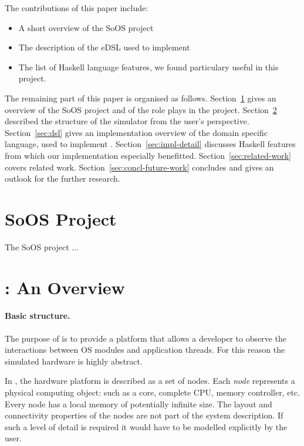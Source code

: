 The contributions of this paper include:
\begin{itemize}
\item A short overview of the SoOS project
\item The description of the eDSL used to implement \soosim
\item The list of Haskell language features, we found particulary useful in this project.
\end{itemize}

The remaining part of this paper is organised as follows.
Section~\ref{sec:soos-project} gives an overview of the SoOS project and of the role \soosim plays in the project.
Section~\ref{sec:soosim-an-overview} described the structure of the \soosim simulator from the user's perspective.
Section~\ref{sec:dsl} gives an implementation overview of the domain specific language, used to implement \soosim.
Section~\ref{sec:impl-detail} discusses Haskell features from which our implementation especially benefitted.
Section~\ref{sec:related-work} covers related work.
Section~\ref{sec:concl-future-work} concludes and gives an outlook for the further research.

\section{SoOS Project}
\label{sec:soos-project}

The SoOS project  \cite{soos}...

\section{\soosim: An Overview}
\label{sec:soosim-an-overview}

\paragraph{Basic structure.} 
The purpose of \soosim is to provide a platform that allows a developer to observe the interactions between OS modules and application threads.
For this reason the simulated hardware is highly abstract.

In \soosim, the hardware platform is described as a set of nodes.
Each \emph{node} represents a physical computing object: such as a core, complete CPU, memory controller, etc.
Every node has a local memory of potentially infinite size.
The layout and connectivity properties of the nodes are not part of the system description.
If such a level of detail is required it would have to be modelled explicitly by the user.

